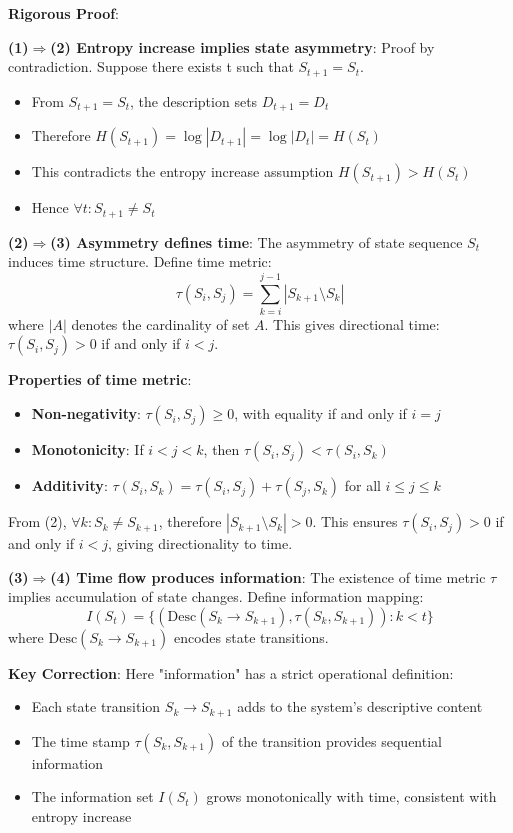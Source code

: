 \textbf{Rigorous Proof}:

\textbf{(1)$\Rightarrow$(2) Entropy increase implies state asymmetry}:
Proof by contradiction. Suppose there exists t such that $S_{t+1} = S_t$.
\begin{itemize}
\item From $S_{t+1} = S_t$, the description sets $D_{t+1} = D_t$
\item Therefore $H(S_{t+1}) = \log |D_{t+1}| = \log |D_t| = H(S_t)$
\item This contradicts the entropy increase assumption $H(S_{t+1}) > H(S_t)$
\item Hence $\forall t: S_{t+1} \neq S_t$
\end{itemize}

\textbf{(2)$\Rightarrow$(3) Asymmetry defines time}:
The asymmetry of state sequence ${S_t}$ induces time structure. Define time metric:
\begin{equation}
\tau(S_i, S_j) = \sum_{k=i}^{j-1} |S_{k+1} \setminus S_k|
\end{equation}
where $|A|$ denotes the cardinality of set $A$. This gives directional time: $\tau(S_i, S_j) > 0$ if and only if $i < j$.

\textbf{Properties of time metric}:
\begin{itemize}
\item \textbf{Non-negativity}: $\tau(S_i, S_j) \geq 0$, with equality if and only if $i = j$
\item \textbf{Monotonicity}: If $i < j < k$, then $\tau(S_i, S_j) < \tau(S_i, S_k)$
\item \textbf{Additivity}: $\tau(S_i, S_k) = \tau(S_i, S_j) + \tau(S_j, S_k)$ for all $i \leq j \leq k$
\end{itemize}

From (2), $\forall k: S_k \neq S_{k+1}$, therefore $|S_{k+1} \setminus S_k| > 0$.
This ensures $\tau(S_i, S_j) > 0$ if and only if $i < j$, giving directionality to time.

\textbf{(3)$\Rightarrow$(4) Time flow produces information}:
The existence of time metric $\tau$ implies accumulation of state changes. Define information mapping:
\begin{equation}
I(S_t) = \{(\text{Desc}(S_k \to S_{k+1}), \tau(S_k, S_{k+1})) : k < t\}
\end{equation}
where $\text{Desc}(S_k \to S_{k+1})$ encodes state transitions.

\textbf{Key Correction}: Here "information" has a strict operational definition:
\begin{itemize}
\item Each state transition $S_k \to S_{k+1}$ adds to the system's descriptive content
\item The time stamp $\tau(S_k, S_{k+1})$ of the transition provides sequential information
\item The information set $I(S_t)$ grows monotonically with time, consistent with entropy increase
\end{itemize}

